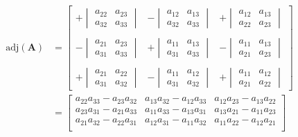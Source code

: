 \begin{small}
    \noindent\begin{align*}
        \mathrm{adj}(\mathbf{A}) & = \begin{bmatrix}
                                         +\begin{vmatrix}a_{22}&a_{23}\\a_{32}&a_{33}\end{vmatrix} & -\begin{vmatrix}a_{12}&a_{13}\\a_{32}&a_{33}\end{vmatrix} & +\begin{vmatrix}a_{12}&a_{13}\\a_{22}&a_{23}\end{vmatrix} \\\\
                                         -\begin{vmatrix}a_{21}&a_{23}\\a_{31}&a_{33}\end{vmatrix} & +\begin{vmatrix}a_{11}&a_{13}\\a_{31}&a_{33}\end{vmatrix} & -\begin{vmatrix}a_{11}&a_{13}\\a_{21}&a_{23}\end{vmatrix} \\\\
                                         +\begin{vmatrix}a_{21}&a_{22}\\a_{31}&a_{32}\end{vmatrix} & -\begin{vmatrix}a_{11}&a_{12}\\a_{31}&a_{32}\end{vmatrix} & +\begin{vmatrix}a_{11}&a_{12}\\a_{21}&a_{22}\end{vmatrix}
                                     \end{bmatrix} \\
                                 & = \begin{bmatrix}
                                         a_{22}a_{33}-a_{23}a_{32} & a_{13}a_{32}-a_{12}a_{33} & a_{12}a_{23}-a_{13}a_{22} \\
                                         a_{23}a_{31}-a_{21}a_{33} & a_{11}a_{33}-a_{13}a_{31} & a_{13}a_{21}-a_{11}a_{23} \\
                                         a_{21}a_{32}-a_{22}a_{31} & a_{12}a_{31}-a_{11}a_{32} & a_{11}a_{22}-a_{12}a_{21} \\
                                     \end{bmatrix}
    \end{align*}
\end{small}

